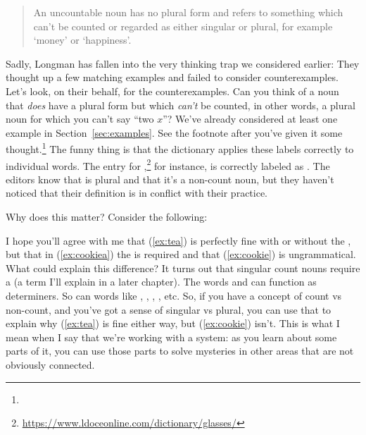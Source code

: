 \begin{quote}
    An uncountable noun has no plural form and refers to something which can't be counted or regarded as either singular or plural, for example `money' or `happiness'.
\end{quote}
Sadly, Longman has fallen into the very thinking trap we considered earlier: They thought up a few matching examples and failed to consider counterexamples. Let's look, on their behalf, for the counterexamples. Can you think of a noun that \emph{does} have a plural form but which \emph{can't} be counted, in other words, a plural noun for which you can't say \enquote{two $x$}? We've already considered at least one example in Section~\ref{sec:examples}. See the footnote after you've given it some thought.\footnote{
} The funny thing is that the dictionary applies these labels correctly to individual words. The entry for ,\footnote{\url{https://www.ldoceonline.com/dictionary/glasses/}} for instance, is correctly labeled as . The editors know that  is plural and that it's a non-count noun, but they haven't noticed that their definition is in conflict with their practice.


\begin{tblsframed}{Why does this matter?}
    Consider the following: 
    
    \ea
        \label{ex:tea}
        \label{ex:cookiea}
        \label{ex:cookie}
        \z\label{ex:blank}
    \z
    I hope you'll agree with me that (\ref{ex:tea}) is perfectly fine with or without the , but that in (\ref{ex:cookiea}) the  is required and that (\ref{ex:cookie}) is ungrammatical. What could explain this difference? It turns out that singular count nouns require a  (a term I'll explain in a later chapter). The words  and  can function as determiners. So can words like , , , , etc. So, if you have a concept of count vs non-count, and you've got a sense of singular vs plural, you can use that to explain why (\ref{ex:tea}) is fine either way, but (\ref{ex:cookie}) isn't. This is what I mean when I say that we're working with a system: as you learn about some parts of it, you can use those parts to solve mysteries in other areas that are not obviously connected.
\end{tblsframed}

